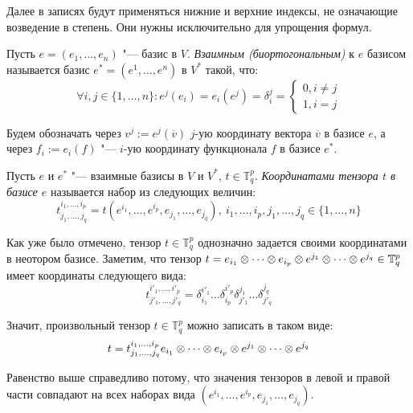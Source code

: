 \begin{note}
	Далее в записях будут применяться нижние и верхние индексы, не означающие возведение в степень. Они нужны исключительно для упрощения формул.
\end{note}

\begin{definition}
	Пусть $e = (e_1, \dots, e_n)$ "--- базис в $V$. \textit{Взаимным (биортогональным)} к $e$ базисом называется базис $e^* = (e^1, \dots, e^n)$ в $V^*$ такой, что:
	\[\forall i, j \in \{1, \dotsc, n\}: e^j(e_i) = e_i(e^j) = \delta^j_i = \left\{\begin{aligned}
	0, i \ne j\\
	1, i = j
	\end{aligned}\right.\]
	
	Будем обозначать через $v^j := e^j(\overline{v})$ $j$-ую координату вектора $\overline{v}$ в базисе $e$, а через $f_i := e_i(f)$ "--- $i$-ую координату функционала $f$ в базисе $e^*$.
\end{definition}

\begin{definition}
	Пусть $e$ и $e^*$ "--- взаимные базисы в $V$ и $V^*$, $t \in \mathbb{T}^p_q$. \textit{Координатами тензора $t$ в базисе $e$} называется набор из следующих величин:
	\[t^{i_1, \dots, i_p}_{j_1, \dots, j_q} = t(e^{i_1}, \dots, e^{i_p}, e_{j_1}, \dots, e_{j_q}),~i_1, \dots, i_p, j_1, \dots, j_q \in \{1, \dots, n\}\]
\end{definition}

\begin{note}
	Как уже было отмечено, тензор $t \in \mathbb T^p_q$ однозначно задается своими координатами в неотором базисе. Заметим, что тензор $t = e_{i_1} \otimes \dots \otimes e_{i_p} \otimes e^{j_1} \hm{\otimes} \dots \otimes e^{j_q} \hm{\in} \mathbb{T}^p_q$ имеет координаты следующего вида:
	\[t^{i'_1, \dots, i'_p}_{j'_1, \dots, j'_q} = \delta_{i_1}^{i'_1}\dots\delta_{i_p}^{i'_p}\delta_{j'_1}^{j_1}\dots\delta_{j'_q}^{j_q}\]
	
	Значит, произвольный тензор $t \in \mathbb{T}^p_q$ можно записать в таком виде:
	\[t = t^{i_1, \dots, i_p}_{j_1, \dots, j_q}e_{i_1} \otimes \dots \otimes e_{i_p} \otimes e^{j_1} \hm{\otimes} \dots \otimes e^{j_q}\]
	
	Равенство выше справедливо потому, что значения тензоров в левой и правой части совпадают на всех наборах вида $(e^{i_1}, \dots, e^{i_p}, e_{j_1}, \dots, e_{j_q})$.
\end{note}
	
